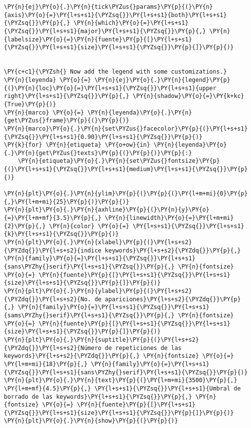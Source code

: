 \begin{tcolorbox}[breakable, size=fbox, boxrule=1pt, pad at break*=1mm,colback=cellbackground, colframe=cellborder]
\begin{Verbatim}[commandchars=\\\{\}]
\PY{n}{ej}\PY{o}{.}\PY{n}{tick\PYZus{}params}\PY{p}{(}\PY{n}{axis}\PY{o}{=}\PY{l+s+s1}{\PYZsq{}}\PY{l+s+s1}{both}\PY{l+s+s1}{\PYZsq{}}\PY{p}{,} \PY{n}{which}\PY{o}{=}\PY{l+s+s1}{\PYZsq{}}\PY{l+s+s1}{major}\PY{l+s+s1}{\PYZsq{}}\PY{p}{,} \PY{n}{labelsize}\PY{o}{=}\PY{n}{fuente}\PY{p}{[}\PY{l+s+s1}{\PYZsq{}}\PY{l+s+s1}{size}\PY{l+s+s1}{\PYZsq{}}\PY{p}{]}\PY{p}{)}


\PY{c+c1}{\PYZsh{} Now add the legend with some customizations.}
\PY{n}{leyenda} \PY{o}{=} \PY{n}{ej}\PY{o}{.}\PY{n}{legend}\PY{p}{(}\PY{n}{loc}\PY{o}{=}\PY{l+s+s1}{\PYZsq{}}\PY{l+s+s1}{upper right}\PY{l+s+s1}{\PYZsq{}}\PY{p}{,} \PY{n}{shadow}\PY{o}{=}\PY{k+kc}{True}\PY{p}{)}
\PY{n}{marco} \PY{o}{=} \PY{n}{leyenda}\PY{o}{.}\PY{n}{get\PYZus{}frame}\PY{p}{(}\PY{p}{)}
\PY{n}{marco}\PY{o}{.}\PY{n}{set\PYZus{}facecolor}\PY{p}{(}\PY{l+s+s1}{\PYZsq{}}\PY{l+s+s1}{0.90}\PY{l+s+s1}{\PYZsq{}}\PY{p}{)}
\PY{k}{for} \PY{n}{etiqueta} \PY{o+ow}{in} \PY{n}{leyenda}\PY{o}{.}\PY{n}{get\PYZus{}texts}\PY{p}{(}\PY{p}{)}\PY{p}{:}
    \PY{n}{etiqueta}\PY{o}{.}\PY{n}{set\PYZus{}fontsize}\PY{p}{(}\PY{l+s+s1}{\PYZsq{}}\PY{l+s+s1}{medium}\PY{l+s+s1}{\PYZsq{}}\PY{p}{)}
            
\PY{n}{plt}\PY{o}{.}\PY{n}{ylim}\PY{p}{(}\PY{p}{(}\PY{l+m+mi}{0}\PY{p}{,}\PY{l+m+mi}{25}\PY{p}{)}\PY{p}{)}
\PY{n}{plt}\PY{o}{.}\PY{n}{axhline}\PY{p}{(}\PY{n}{y}\PY{o}{=}\PY{l+m+mf}{3.5}\PY{p}{,} \PY{n}{linewidth}\PY{o}{=}\PY{l+m+mi}{2}\PY{p}{,} \PY{n}{color} \PY{o}{=} \PY{l+s+s1}{\PYZsq{}}\PY{l+s+s1}{k}\PY{l+s+s1}{\PYZsq{}}\PY{p}{)}
\PY{n}{plt}\PY{o}{.}\PY{n}{xlabel}\PY{p}{(}\PY{l+s+s2}{\PYZdq{}}\PY{l+s+s2}{indice keywords}\PY{l+s+s2}{\PYZdq{}}\PY{p}{,} \PY{n}{family}\PY{o}{=}\PY{l+s+s1}{\PYZsq{}}\PY{l+s+s1}{sans\PYZhy{}serif}\PY{l+s+s1}{\PYZsq{}}\PY{p}{,} \PY{n}{fontsize} \PY{o}{=} \PY{n}{fuente}\PY{p}{[}\PY{l+s+s1}{\PYZsq{}}\PY{l+s+s1}{size}\PY{l+s+s1}{\PYZsq{}}\PY{p}{]}\PY{p}{)}
\PY{n}{plt}\PY{o}{.}\PY{n}{ylabel}\PY{p}{(}\PY{l+s+s2}{\PYZdq{}}\PY{l+s+s2}{No. de apariciones}\PY{l+s+s2}{\PYZdq{}}\PY{p}{,} \PY{n}{family}\PY{o}{=}\PY{l+s+s1}{\PYZsq{}}\PY{l+s+s1}{sams\PYZhy{}serif}\PY{l+s+s1}{\PYZsq{}}\PY{p}{,} \PY{n}{fontsize} \PY{o}{=} \PY{n}{fuente}\PY{p}{[}\PY{l+s+s1}{\PYZsq{}}\PY{l+s+s1}{size}\PY{l+s+s1}{\PYZsq{}}\PY{p}{]}\PY{p}{)}
\PY{n}{plt}\PY{o}{.}\PY{n}{suptitle}\PY{p}{(}\PY{l+s+s2}{\PYZdq{}}\PY{l+s+s2}{Número de repeticiones de las keywords}\PY{l+s+s2}{\PYZdq{}}\PY{p}{,} \PY{n}{fontsize} \PY{o}{=} \PY{l+m+mi}{18}\PY{p}{,} \PY{n}{family}\PY{o}{=}\PY{l+s+s1}{\PYZsq{}}\PY{l+s+s1}{sans\PYZhy{}serif}\PY{l+s+s1}{\PYZsq{}}\PY{p}{)}
\PY{n}{plt}\PY{o}{.}\PY{n}{text}\PY{p}{(}\PY{l+m+mi}{3500}\PY{p}{,} \PY{l+m+mf}{4.5}\PY{p}{,} \PY{l+s+s1}{\PYZsq{}}\PY{l+s+s1}{Umbral de borrado de las keywords}\PY{l+s+s1}{\PYZsq{}}\PY{p}{,} \PY{n}{fontsize} \PY{o}{=} \PY{n}{fuente}\PY{p}{[}\PY{l+s+s1}{\PYZsq{}}\PY{l+s+s1}{size}\PY{l+s+s1}{\PYZsq{}}\PY{p}{]}\PY{p}{)}
\PY{n}{plt}\PY{o}{.}\PY{n}{show}\PY{p}{(}\PY{p}{)}
\end{Verbatim}
\end{tcolorbox}

